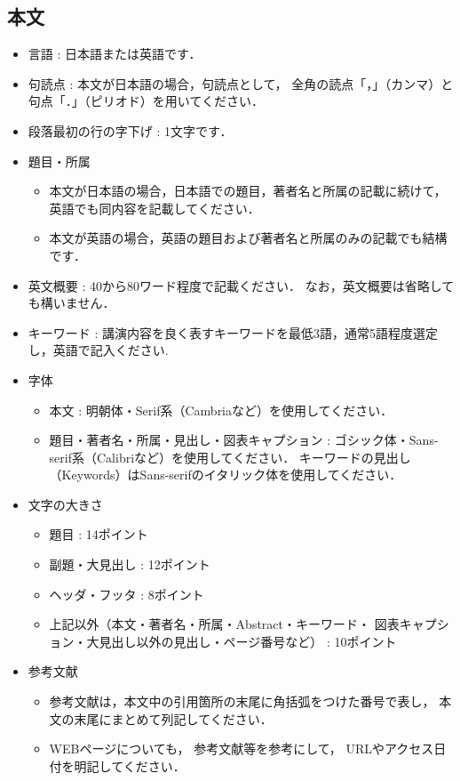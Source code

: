 \documentclass{ltjoc}
\begin{document}
\subsection{本文}
\begin{itemize}
\item 言語 : 日本語または英語です．
\item 句読点 : 本文が日本語の場合，句読点として，
  全角の読点「，」（カンマ）と句点「．」（ピリオド）を用いてください． 
\item 段落最初の行の字下げ : 1文字です．
\item 題目・所属
  \begin{itemize}
  \item 
    本文が日本語の場合，日本語での題目，著者名と所属の記載に続けて，
    英語でも同内容を記載してください．
  \item 
    本文が英語の場合，英語の題目および著者名と所属のみの記載でも結構です．
  \end{itemize}
\item 英文概要 : 40から80ワード程度で記載ください．
  なお，英文概要は省略しても構いません．
\item キーワード : 講演内容を良く表すキーワードを最低3語，通常5語程度選定し，英語で記入ください.
\item 字体
  \begin{itemize}
  \item 本文 :
    明朝体・Serif系（Cambriaなど）を使用してください．
  \item 題目・著者名・所属・見出し・図表キャプション : 
    ゴシック体・Sans-serif系（Calibriなど）を使用してください．
    キーワードの見出し（Keywords）はSans-serifのイタリック体を使用してください．
  \end{itemize}
\item 文字の大きさ
  \begin{itemize}
  \item 題目 : 14ポイント
  \item 副題・大見出し : 12ポイント
  \item ヘッダ・フッタ : 8ポイント
  \item 上記以外（本文・著者名・所属・Abstract・キーワード・
      図表キャプション・大見出し以外の見出し・ページ番号など） : 10ポイント
  \end{itemize}
\item 参考文献
  \begin{itemize}
  \item 
  参考文献は，本文中の引用箇所の末尾に角括弧をつけた番号で表し，
  本文の末尾にまとめて列記してください．
  \item 
  WEBページについても，
  参考文献\cite{BB21459576}等を参考にして，
  URLやアクセス日付を明記してください．
  \end{itemize}
\end{itemize}
\end{document}
